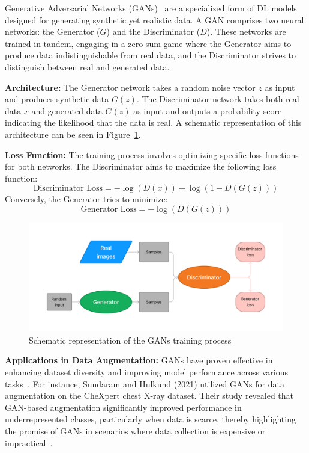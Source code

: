 Generative Adversarial Networks (GANs)~\cite{goodfellow} are a specialized form of DL models designed for generating synthetic yet realistic data. A GAN comprises two neural networks: the Generator (\(G\)) and the Discriminator (\(D\)). These networks are trained in tandem, engaging in a zero-sum game where the Generator aims to produce data indistinguishable from real data, and the Discriminator strives to distinguish between real and generated data.

\textbf{Architecture:} The Generator network takes a random noise vector \(z\) as input and produces synthetic data \(G(z)\). The Discriminator network takes both real data \(x\) and generated data \(G(z)\) as input and outputs a probability score indicating the likelihood that the data is real. A schematic representation of this architecture can be seen in Figure~\ref{fig:gan_training_process}.

\textbf{Loss Function:} The training process involves optimizing specific loss functions for both networks. The Discriminator aims to maximize the following loss function:
\[
\text{Discriminator Loss} = -\log(D(x)) - \log(1 - D(G(z)))
\]
Conversely, the Generator tries to minimize:
\[
\text{Generator Loss} = -\log(D(G(z)))
\]

\begin{figure}[H]
\centering
\includegraphics[width=\columnwidth]{main/content/images/diagrams/GAN.png}
\caption{Schematic representation of the GANs training process}
\label{fig:gan_training_process}
\end{figure}

\textbf{Applications in Data Augmentation:} GANs have proven effective in enhancing dataset diversity and improving model performance across various tasks~\cite{goodfellow, shorten}. For instance, Sundaram and Hulkund (2021) utilized GANs for data augmentation on the CheXpert chest X-ray dataset. Their study revealed that GAN-based augmentation significantly improved performance in underrepresented classes, particularly when data is scarce, thereby highlighting the promise of GANs in scenarios where data collection is expensive or impractical~\cite{sundaram}.

